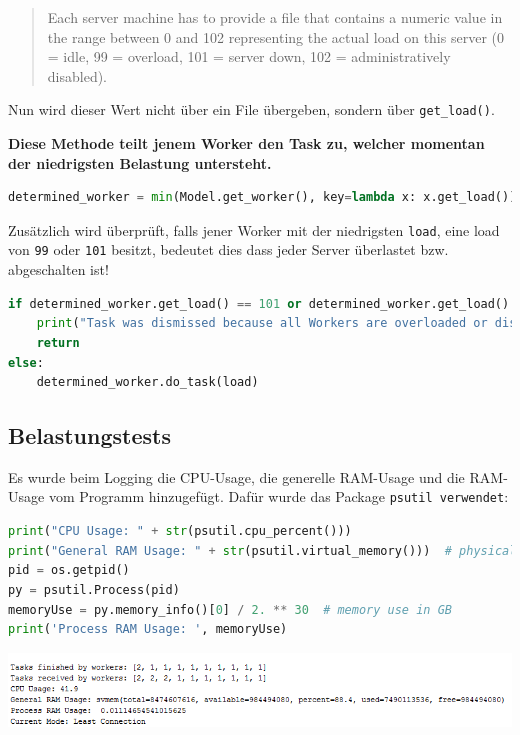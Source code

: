 \begin{quote}
Each server machine has to provide a file that contains a numeric value in the range between 0 and 102 representing the actual load on this server (0 = idle, 99 = overload, 101 = server down, 102 = administratively disabled).
\end{quote}

Nun wird dieser Wert nicht über ein File übergeben, sondern über \verb|get_load()|.

\textbf{Diese Methode teilt jenem Worker den Task zu, welcher momentan der niedrigsten Belastung untersteht.}

\begin{lstlisting}[language=python]
determined_worker = min(Model.get_worker(), key=lambda x: x.get_load())
\end{lstlisting}

Zusätzlich wird überprüft, falls jener Worker mit der niedrigsten \verb|load|, eine load von \verb|99| oder \verb|101| besitzt, bedeutet dies dass jeder Server überlastet bzw. abgeschalten ist!

\begin{lstlisting}[language=python]
if determined_worker.get_load() == 101 or determined_worker.get_load() == 99:
	print("Task was dismissed because all Workers are overloaded or disabled!")
	return
else:
	determined_worker.do_task(load)
\end{lstlisting}

\subsection{Belastungstests}
Es wurde beim Logging die CPU-Usage, die generelle RAM-Usage und die RAM-Usage vom Programm hinzugefügt. Dafür wurde das Package \verb|psutil verwendet|:

\begin{lstlisting}[language=python]
print("CPU Usage: " + str(psutil.cpu_percent()))
print("General RAM Usage: " + str(psutil.virtual_memory()))  # physical memory usage
pid = os.getpid()
py = psutil.Process(pid)
memoryUse = py.memory_info()[0] / 2. ** 30  # memory use in GB
print('Process RAM Usage: ', memoryUse)
\end{lstlisting}

\begin{minipage}{\linewidth}
	\centering
	\includegraphics[width=1\linewidth]{images/belastung}
\end{minipage}

